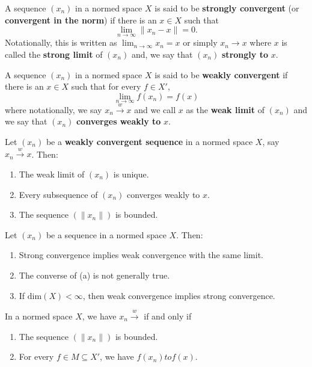 \begin{definition}
    A sequence \( ({x}_{n}) \) in a normed space \( X  \) is said to be \textbf{strongly convergent} (or \textbf{convergent in the norm}) if there is an \( x \in X  \) such that 
    \[  \lim_{ n \to \infty  }  \|{x}_{n} - x \| = 0.  \]
    Notationally, this is written as \( \lim_{ n \to \infty  }  {x}_{n} = x  \) or simply \( {x}_{n} \to x  \) where \( x  \) is called the \textbf{strong limit} of \( ({x}_{n}) \) and, we say that \( ({x}_{n}) \) \textbf{strongly to} \( x \). 
\end{definition}

\begin{definition}
    A sequence \( ({x}_{n}) \) in a normed space \( X  \) is said to be \textbf{weakly convergent} if there is an \( x \in X  \) such that for every \( f \in X' \),
    \[  \lim_{ n \to \infty  }  f({x}_{n}) = f(x) \]
    where notationally, we say \( {x}_{n} \overset{w}{\longrightarrow} x  \) and we call \( x  \) as the \textbf{weak limit} of \( ({x}_{n}) \) and we say that \( ({x}_{n}) \) \textbf{converges weakly to} \( x  \).
\end{definition}

\begin{lemma}
    Let \( ({x}_{n}) \) be a \textbf{weakly convergent sequence} in a normed space \( X  \), say \( {x}_{n} \overset{w}{\longrightarrow} x  \). Then: 
    \begin{enumerate}
        \item[(a)] The weak limit of \( ({x}_{n})  \) is unique.
        \item[(b)] Every subsequence of \( ({x}_{n}) \) converges weakly to \( x  \).
        \item[(c)] The sequence \( (\|{x}_{n}\|) \) is bounded.
    \end{enumerate}
\end{lemma}

\begin{theorem}
    Let \( ({x}_{n})  \) be a sequence in a normed space \( X  \). Then: 
    \begin{enumerate}
        \item[(a)] Strong convergence implies weak convergence with the same limit. 
        \item[(b)] The converse of (a) is not generally true.
        \item[(c)] If \( \text{dim}(X) < \infty   \), then weak convergence implies strong convergence.
     \end{enumerate}
\end{theorem}

\begin{lemma}
    In a normed space \( X  \), we have \( {x}_{n} \overset{w}{\longrightarrow} \) if and only if 
    \begin{enumerate}
        \item[(A)] The sequence \( (\|{x}_{n}\|) \) is bounded.
        \item[(B)] For every \( f \in M \subseteq  X'  \), we have \( f({x}_{n}) to f(x) \). 
    \end{enumerate}
\end{lemma}
